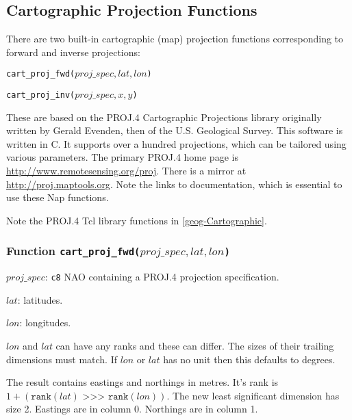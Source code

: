 \subsection{Cartographic Projection Functions}
\label{function-Cart-Proj}

There are two built-in cartographic (map) projection functions corresponding to forward
and inverse projections:
\begin{bullets}
    \item \texttt{cart\_proj\_fwd(}$\mathit{proj\_spec, lat, lon}$\texttt{)} 
    \item \texttt{cart\_proj\_inv(}$\mathit{proj\_spec, x, y}$\texttt{)} 
\end{bullets}

These are based on the 
PROJ.4 Cartographic Projections library originally written by Gerald Evenden, then of the 
U.S. Geological Survey.
This software is written in C.
It supports over a hundred projections, which can be tailored using various parameters.
The primary PROJ.4 home page is
\href{http://www.remotesensing.org/proj}{http://www.remotesensing.org/proj}.
There is a mirror at
\href{http://proj.maptools.org}{http://proj.maptools.org}. 
Note the links to documentation, which is essential to use these Nap functions.

Note the PROJ.4 Tcl library functions in \ref{geog-Cartographic}.

\subsubsection{Function \texttt{cart\_proj\_fwd(}$\mathit{proj\_spec, lat, lon}$\texttt{)}}
\label{function-cart-proj-fwd}

\begin{simpleitems}
    \item $\mathit{proj\_spec}$: \texttt{c8} NAO containing a PROJ.4 projection specification.
    \item $\mathit{lat}$: latitudes.
    \item $\mathit{lon}$: longitudes.
\end{simpleitems}

$\mathit{lon}$ and $\mathit{lat}$ can have any ranks and these can differ.
The sizes of their trailing dimensions must match.
If $\mathit{lon}$ or $\mathit{lat}$ has no unit then this defaults to degrees.

The result contains eastings and northings in metres.
It's rank is
$1 + (\texttt{rank}(\mathit{lat}) \texttt{ >>> } \texttt{rank}(\mathit{lon}))$.
The new least significant dimension has size 2.
Eastings are in column 0.  Northings are in column 1.

